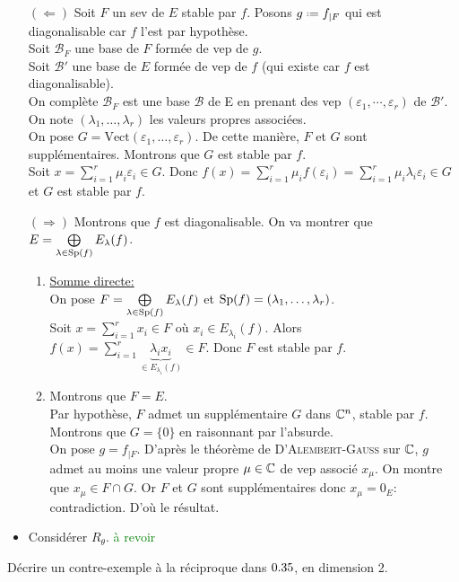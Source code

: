 \begin{preuve}
    \begin{itemize}
        \item[$(\Leftarrow)$] Soit $F$ un sev de $E$ stable par $f$.
        Posons $g \defeq f_{\vert F}$ qui est diagonalisable car $f$ l'est par hypothèse. \\
        Soit $\mathscr{B}_F$ une base de $F$ formée de vep de $g$. \\
        Soit $\mathscr{B}'$ une base de $E$ formée de vep de $f$ (qui existe car $f$ est diagonalisable). \\
        On complète $\mathscr{B}_F$ est une base $\mathscr{B}$ de E en prenant des vep $(\varepsilon_1, \cdots, \varepsilon_r)$ de $\mathscr{B}'$. On note $(\lambda_1, \dots, \lambda_r)$ les valeurs propres associées. \\
        On pose $G = \mathrm{Vect}(\varepsilon_1, \dots, \varepsilon_r)$. De cette manière, $F$ et $G$ sont supplémentaires. Montrons que $G$ est stable par $f$. \\
        Soit $x = \sum\limits_{i=1}^{r} \mu_i \varepsilon_i \in G$. Donc $f(x) = \sum\limits_{i=1}^{r} \mu_i f(\varepsilon_i) =  \sum\limits_{i=1}^{r} \mu_i \lambda_i \varepsilon_i \in G$ et $G$ est stable par $f$.
    
        \item[$(\Rightarrow)$] Montrons que $f$ est diagonalisable. On va montrer que $E = \bigoplus\limits_{\lambda \in \mathrm{Sp}(f)} E_\lambda (f)$.
        
        \begin{enumerate}
            \item \underline{Somme directe:} \\
            On pose $F = \bigoplus\limits_{\lambda \in \mathrm{Sp}(f)} E_\lambda (f)$ et $\mathrm{Sp}(f) = (\lambda_1, \dots, \lambda_r)$. \\
            Soit $x = \sum\limits_{i=1}^{r} x_i \in F$ où $x_i \in E_{\lambda_i}(f)$. Alors $f(x) = \sum\limits_{i=1}^{r} \underbrace{\lambda_i x_i}_{\in E_{\lambda_i}(f)} \in F$. Donc $F$ est stable par $f$.
            \item Montrons que $F = E$. \\
            Par hypothèse, $F$ admet un supplémentaire $G$ dans $\mathbb{C}^n$, stable par $f$. Montrons que $G = \{0\}$ en raisonnant par l'absurde. \\
            On pose $g = f_{\vert F}$. D'après le théorème de \textsc{D'Alembert-Gauss} sur $\mathbb{C}$, $g$ admet au moins une valeur propre $\mu \in \mathbb{C}$ de vep associé $x_\mu$. On montre que $x_\mu \in F \cap G$. Or $F$ et $G$ sont supplémentaires donc $x_\mu = 0_E$: contradiction. D'où le résultat. 
        \end{enumerate}
        \item Considérer $R_\theta$. \textcolor{green}{à revoir}
    \end{itemize}
\end{preuve}

\begin{exercice}
    Décrire un contre-exemple à la réciproque dans $0.35$, en dimension 2.
\end{exercice}  
